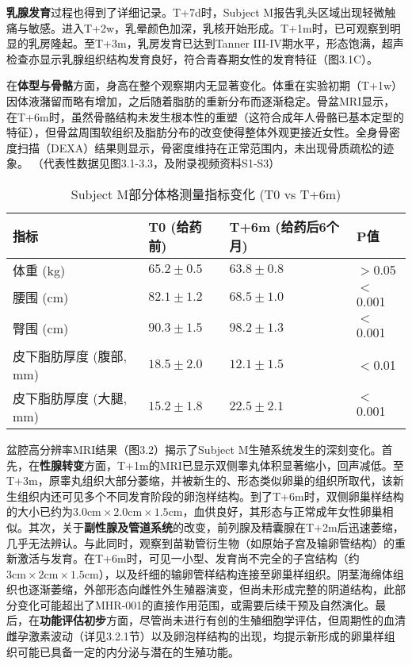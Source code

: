 \textbf{乳腺发育}过程也得到了详细记录。T+7d时，Subject M报告乳头区域出现轻微触痛与敏感。进入T+2w，乳晕颜色加深，乳核开始形成。T+1m时，已可观察到明显的乳房隆起。至T+3m，乳房发育已达到Tanner III-IV期水平，形态饱满，超声检查亦显示乳腺组织结构发育良好，符合青春期女性的发育特征（图3.1C）。

在\textbf{体型与骨骼}方面，身高在整个观察期内无显著变化。体重在实验初期（T+1w）因体液潴留而略有增加，之后随着脂肪的重新分布而逐渐稳定。骨盆MRI显示，在T+6m时，虽然骨骼结构未发生根本性的重塑（这符合成年人骨骼已基本定型的特征），但骨盆周围软组织及脂肪分布的改变使得整体外观更接近女性。全身骨密度扫描（DEXA）结果则显示，骨密度维持在正常范围内，未出现骨质疏松的迹象。
（代表性数据见图3.1-3.3，及附录视频资料S1-S3）

\begin{table}[h!]
\centering
\caption{Subject M部分体格测量指标变化 (T0 vs T+6m)}
\label{tab:subject_m_changes}
\begin{tabular}{llll}
\hline
指标             & T0 (给药前)       & T+6m (给药后6个月) & P值     \\
\hline
体重 (kg)        & $65.2 \pm 0.5$        & $63.8 \pm 0.8$         & $>$0.05   \\
腰围 (cm)        & $82.1 \pm 1.2$        & $68.5 \pm 1.0$         & $<$0.001  \\
臀围 (cm)        & $90.3 \pm 1.5$        & $98.2 \pm 1.3$         & $<$0.001  \\
皮下脂肪厚度 (腹部, mm) & $18.5 \pm 2.0$        & $12.1 \pm 1.5$         & $<$0.01   \\
皮下脂肪厚度 (大腿, mm) & $15.2 \pm 1.8$        & $22.5 \pm 2.1$         & $<$0.001  \\
\hline
\end{tabular}
\end{table}

盆腔高分辨率MRI结果（图3.2）揭示了Subject M生殖系统发生的深刻变化。首先，在\textbf{性腺转变}方面，T+1m的MRI已显示双侧睾丸体积显著缩小，回声减低。至T+3m，原睾丸组织大部分萎缩，并被新生的、形态类似卵巢的组织所取代，该新生组织内还可见多个不同发育阶段的卵泡样结构。到了T+6m时，双侧卵巢样结构的大小已约为$3.0\text{cm} \times 2.0\text{cm} \times 1.5\text{cm}$，血供良好，其形态与正常成年女性卵巢相似。其次，关于\textbf{副性腺及管道系统}的改变，前列腺及精囊腺在T+2m后迅速萎缩，几乎无法辨认。与此同时，观察到苗勒管衍生物（如原始子宫及输卵管结构）的重新激活与发育。在T+6m时，可见一小型、发育尚不完全的子宫结构（约$3\text{cm} \times 2\text{cm} \times 1.5\text{cm}$），以及纤细的输卵管样结构连接至卵巢样组织。阴茎海绵体组织也逐渐萎缩，外部形态向雌性外生殖器演变，但尚未形成完整的阴道结构，此部分变化可能超出了MHR-001的直接作用范围，或需要后续干预及自然演化。最后，在\textbf{功能评估初步}方面，尽管尚未进行有创的生殖细胞学评估，但周期性的血清雌孕激素波动（详见3.2.1节）以及卵泡样结构的出现，均提示新形成的卵巢样组织可能已具备一定的内分泌与潜在的生殖功能。

